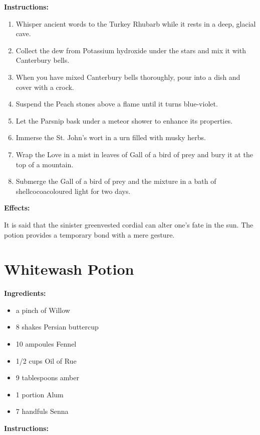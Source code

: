 \documentclass{article}
\begin{document}
\textbf{Instructions:}

\begin{enumerate}
  \item Whisper ancient words to the Turkey Rhubarb while it rests in a deep, glacial cave.
  \item Collect the dew from Potassium hydroxide under the stars and mix it with Canterbury bells.
  \item When you have mixed Canterbury bells thoroughly, pour into a dish and cover with a crock.
  \item Suspend the Peach stones above a flame until it turns blue-violet.
  \item Let the Parsnip bask under a meteor shower to enhance its properties.
  \item Immerse the St. John's wort in a urn filled with musky herbs.
  \item Wrap the Love in a mist in leaves of Gall of a bird of prey and bury it at the top of a mountain.
  \item Submerge the Gall of a bird of prey and the mixture in a bath of shellcocoacoloured light for two days.
\end{enumerate}

\textbf{Effects:}

It is said that the sinister greenvested cordial can alter one's fate in the sun. The potion provides a temporary bond with a mere gesture.

\newpage
\section*{Whitewash Potion}

\textbf{Ingredients:}

\begin{itemize}
  \item a pinch of Willow
  \item 8 shakes Persian buttercup
  \item 10 ampoules Fennel
  \item 1/2 cups Oil of Rue
  \item 9 tablespoons amber
  \item 1 portion Alum
  \item 7 handfuls Senna
\end{itemize}

\textbf{Instructions:}
\end{document}
